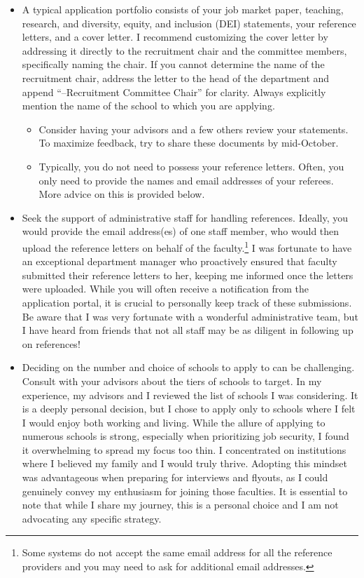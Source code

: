 \documentclass[12pt]{article}
\begin{document}
\begin{itemize}
\item A typical application portfolio consists of your job market paper, teaching, research, and diversity, equity, and inclusion (DEI) statements, your reference letters, and a cover letter. I recommend customizing the cover letter by addressing it directly to the recruitment chair and the committee members, specifically naming the chair. If you cannot determine the name of the recruitment chair,  address the letter to the head of the department and append ``--Recruitment Committee Chair'' for clarity. Always explicitly mention the name of the school to which you are applying.
\begin{itemize}
\item Consider having your advisors and a few others review your statements. To maximize feedback, try to share these documents by mid-October.
\item Typically, you do not need to possess your reference letters. Often, you only need to provide the names and email addresses of your referees. More advice on this is provided below.
\end{itemize}
\item Seek the support of administrative staff for handling references. Ideally, you would provide the email address(es) of one staff member, who would then upload the reference letters on behalf of the faculty.\footnote{Some systems do not accept the same email address for all the reference providers and you may need to ask for additional email addresses.}  I was fortunate to have an exceptional department manager who proactively ensured that faculty submitted their reference letters to her, keeping me informed once the letters were uploaded. While you will often receive a notification from the application portal, it is crucial to personally keep track of these submissions. Be aware that I was very fortunate with a wonderful administrative team, but I have heard from friends that not all staff may be as diligent in following up on references!
\item Deciding on the number and choice of schools to apply to can be challenging. Consult with your advisors about the tiers of schools to target. In my experience, my advisors and I reviewed the list of schools I was considering. It is a deeply personal decision, but I chose to apply only to schools where I felt I would enjoy both working and living. While the allure of applying to numerous schools is strong, especially when prioritizing job security, I found it overwhelming to spread my focus too thin. I concentrated on institutions where I believed my family and I would truly thrive. Adopting this mindset was advantageous when preparing for interviews and flyouts, as I could genuinely convey my enthusiasm for joining those faculties. It is essential to note that while I share my journey, this is a personal choice and I am not advocating any specific strategy.
\end{itemize}
\end{document}
